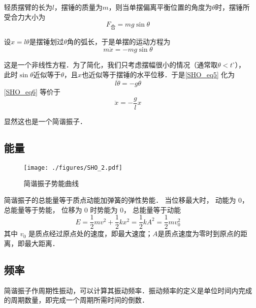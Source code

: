 轻质摆臂的长为$l$，摆锤的质量为$m$，则当单摆偏离平衡位置的角度为$\theta$时，摆锤所受合力大小为
\begin{equation}
F_{\text{合}} = mg\sin\theta
\end{equation}

设$x=l\theta$是摆锤划过$\theta$角的弧长，于是单摆的运动方程为
\begin{equation}\label{SHO_eq5}
m\ddot{x} = -mg\sin\theta
\end{equation}

这是一个非线性方程．为了简化，我们只考虑摆幅很小的情况（通常取$\theta<t^\circ$），此时$\sin\theta$近似等于$\theta$，且$x$也近似等于摆锤的水平位移．于是\autoref{SHO_eq5} 化为
\begin{equation}\label{SHO_eq6}
l\ddot{\theta} = -g\theta
\end{equation}
\autoref{SHO_eq6} 等价于
\begin{equation}\label{SHO_eq7}
\ddot{x} = -\frac{g}{l}x
\end{equation}

显然这也是一个简谐振子．



\subsection{能量}

\begin{figure}[ht]
\centering
\texttt{[image: ./figures/SHO\_2.pdf]}
\caption{简谐振子势能曲线} \label{SHO_fig2}
\end{figure}

简谐振子的总能量等于质点动能加弹簧的弹性势能． 当位移最大时， 动能为 0， 总能量等于势能， 位移为 0 时势能为 0， 总能量等于动能
\begin{equation}
E = \frac{1}{2} mv^2 + \frac12 k x^2 = \frac12 k A^2 = \frac12 m v_0^2
\end{equation}
其中 $v_0$ 是质点经过原点处的速度，即最大速度；$A$是质点速度为零时到原点的距离，即最大距离．


\subsection{频率}

简谐振子作周期性振动，可以计算其振动频率．振动频率的定义是单位时间内完成的周期数量，即完成一个周期所需时间的倒数．

